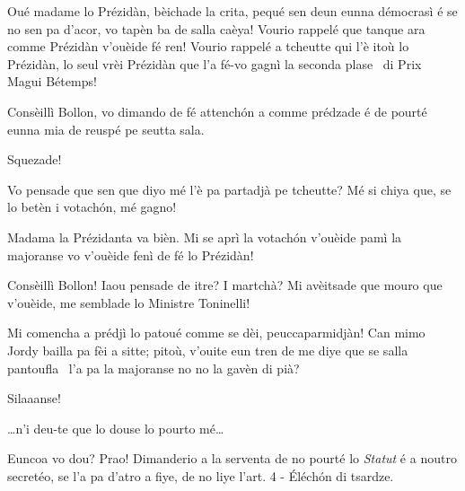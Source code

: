 \begin{drama}
\Jordyspeaks Oué madame lo Prézidàn, bèichade la crita, pequé sen deun eunna démocrasì é se no sen pa d'acor, vo tapèn ba de salla caèya! Vourio rappelé que tanque ara comme Prézidàn v'ouèide fé ren! Vourio rappelé a tcheutte qui l'è itoù lo Prézidàn,  lo seul vrèi Prézidàn que l'a fé-vo gagnì la seconda plase \second\ di Prix Magui Bétemps!


\Presidanspeaks Consèillì Bollon, vo dimando de fé attench\'on a comme prédzade é de pourté eunna mia de reuspé pe seutta sala.

\Jordyspeaks Squezade!

\Presidanspeaks{} Vo pensade que sen que diyo mé l'è pa partadjà pe tcheutte? Mé si chiya que, se lo betèn i votach\'on, mé gagno!


\Jordyspeaks  Madama la Prézidanta va bièn. Mi se aprì la votach\'on v'ouèide pamì la majoranse vo v'ouèide fenì de fé lo Prézidàn!

\Dallasspeaks  Consèillì Bollon! Iaou pensade de itre? I martchà? Mi avèitsade que mouro que v'ouèide, me semblade lo Ministre Toninelli!

\Cimaspeaks {} Mi comencha a prédjì lo patoué comme se dèi, peuccaparmidjàn! Can mimo Jordy bailla pa fèi a sitte; pitoù, v'ouite eun tren de me diye que se salla pantoufla \pantoufla\ l'a pa la majoranse no no la gavèn di pià?


\Presidanspeaks{}  Silaaanse!


\Richardspeaks \ldots  n'i deu-te que lo douse lo pourto mé\ldots

\Presidanspeaks Euncoa vo dou? Prao! Dimanderio a la serventa de no pourté lo \textit{Statut} é a noutro secretéo, se l'a pa d'atro a fiye, de no liye l'art. 4 - \'Eléch\'on di tsardze.



\end{drama}
